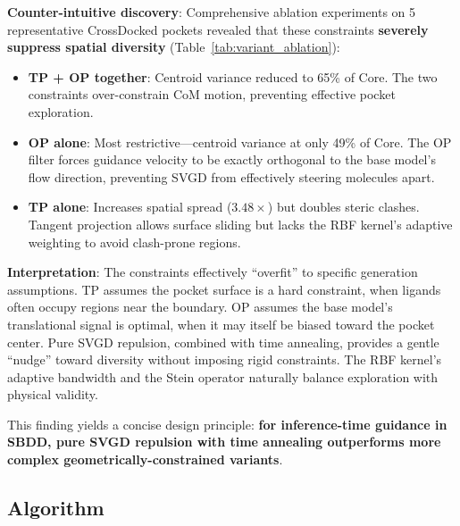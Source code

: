 \documentclass[a4paper,11pt]{article}
\begin{document}
\textbf{Counter-intuitive discovery}: Comprehensive ablation experiments on 5
representative CrossDocked pockets revealed that these constraints
\textbf{severely suppress spatial diversity} (Table~\ref{tab:variant_ablation}):

\begin{itemize}
  \item \textbf{TP + OP together}: Centroid variance reduced to 65\% of Core.
    The two constraints over-constrain CoM motion, preventing effective pocket
    exploration.
  \item \textbf{OP alone}: Most restrictive---centroid variance at only 49\% of
    Core.  The OP filter forces guidance velocity to be exactly orthogonal to the
    base model's flow direction, preventing SVGD from effectively steering
    molecules apart.
  \item \textbf{TP alone}: Increases spatial spread ($3.48\times$) but doubles
    steric clashes.  Tangent projection allows surface sliding but lacks the RBF
    kernel's adaptive weighting to avoid clash-prone regions.
\end{itemize}

\textbf{Interpretation}: The constraints effectively ``overfit'' to specific
generation assumptions.  TP assumes the pocket surface is a hard constraint,
when ligands often occupy regions near the boundary.  OP assumes the base
model's translational signal is optimal, when it may itself be biased toward the
pocket center.  Pure SVGD repulsion, combined with time annealing, provides a
gentle ``nudge'' toward diversity without imposing rigid constraints.  The RBF
kernel's adaptive bandwidth and the Stein operator naturally balance exploration
with physical validity.

This finding yields a concise design principle: \textbf{for inference-time
guidance in SBDD, pure SVGD repulsion with time annealing outperforms more
complex geometrically-constrained variants}.

\subsection{Algorithm}
\end{document}
